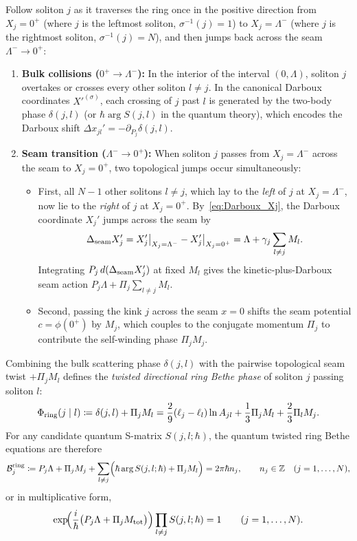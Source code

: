 \documentclass[11pt,a4paper]{article}
\theoremstyle{remark}
\begin{document}
Follow soliton $j$ as it traverses the ring once in the positive direction from $X_j=0^+$ (where $j$ is the leftmost soliton, $\sigma^{-1}(j)=1$) to $X_j=\Lambda^-$ (where $j$ is the rightmost soliton, $\sigma^{-1}(j)=N$), and then jumps back across the seam $\Lambda^-\to 0^+$:
\begin{enumerate}
\item \textbf{Bulk collisions ($0^+\to\Lambda^-$):}
In the interior of the interval $(0,\Lambda)$, soliton $j$ overtakes or crosses every other soliton $l\neq j$. In the canonical Darboux coordinates $X'^{(\sigma)}$, each crossing of $j$ past $l$ is generated by the two-body phase $\delta(j,l)$ (or $\hbar\arg S(j,l)$ in the quantum theory), which encodes the Darboux shift $\Delta x_{jl}'=-\partial_{P_j}\delta(j,l)$.
\item \textbf{Seam transition ($\Lambda^-\to 0^+$):}
When soliton $j$ passes from $X_j=\Lambda^-$ across the seam to $X_j=0^+$, two topological jumps occur simultaneously:
\begin{itemize}
\item First, all $N-1$ other solitons $l\neq j$, which lay to the \emph{left} of $j$ at $X_j=\Lambda^-$, now lie to the \emph{right} of $j$ at $X_j=0^+$. By~\eqref{eq:Darboux_Xj}, the Darboux coordinate $X_j'$ jumps across the seam by
\begin{equation}\label{eq:seam_Darboux}
\Delta_{\rm seam}X_j'=X_j'\big|_{X_j=\Lambda^-}-X_j'\big|_{X_j=0^+}=\Lambda+\gamma_j\sum_{l\neq j}M_l.
\end{equation}
Integrating $P_j\,d(\Delta_{\rm seam}X_j')$ at fixed $M_l$ gives the kinetic-plus-Darboux seam action $P_j\Lambda+\Pi_j\sum_{l\neq j}M_l$.
\item Second, passing the kink $j$ across the seam $x=0$ shifts the seam potential $c=\phi(0^+)$ by $M_j$, which couples to the conjugate momentum $\Pi_j$ to contribute the self-winding phase $\Pi_j M_j$.
\end{itemize}
\end{enumerate}

Combining the bulk scattering phase $\delta(j,l)$ with the pairwise topological seam twist $+\Pi_j M_l$ defines the \emph{twisted directional ring Bethe phase} of soliton $j$ passing soliton $l$:
\begin{equation}\label{eq:Phi_ring}
\Phi_{\rm ring}(j\mid l)\coloneqq \delta(j,l)+\Pi_j M_l
=\frac29(\ell_j-\ell_l)\ln A_{jl}+\frac13\Pi_j M_l+\frac23\Pi_l M_j.
\end{equation}
For any candidate quantum S-matrix $S(j,l;\hbar)$, the quantum twisted ring Bethe equations are therefore
\begin{equation}\label{eq:quantum_ring_BA}
\mathcal B_j^{\rm ring}\coloneqq P_j\Lambda+\Pi_j M_j+\sum_{l\neq j}\Bigl(\hbar\arg S(j,l;\hbar)+\Pi_j M_l\Bigr)=2\pi\hbar n_j,\qquad n_j\in\mathbb Z\quad(j=1,\dots,N),
\end{equation}
or in multiplicative form,
\begin{equation}\label{eq:quantum_ring_BA_mult}
\exp\!\Bigl(\frac{i}{\hbar}\bigl(P_j\Lambda+\Pi_j M_{\rm tot}\bigr)\Bigr)\prod_{l\neq j} S(j,l;\hbar)=1\qquad(j=1,\dots,N).
\end{equation}
\end{document}
